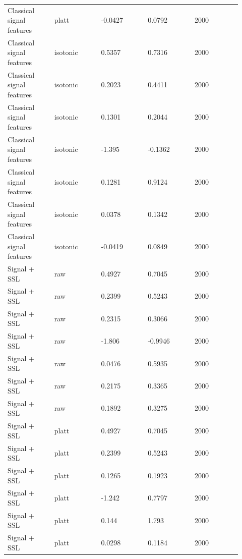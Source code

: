 \documentclass[utf8]{frontiers_suppmat}
\begin{document}
\begin{landscape}
\begin{longtable}{L{0.184\linewidth} L{0.184\linewidth} L{0.184\linewidth} L{0.184\linewidth} L{0.184\linewidth}}
Classical signal features & platt & -\allowbreak{}0.\allowbreak{}0427 & 0.\allowbreak{}0792 & 2000 \\
Classical signal features & isotonic & 0.\allowbreak{}5357 & 0.\allowbreak{}7316 & 2000 \\
Classical signal features & isotonic & 0.\allowbreak{}2023 & 0.\allowbreak{}4411 & 2000 \\
Classical signal features & isotonic & 0.\allowbreak{}1301 & 0.\allowbreak{}2044 & 2000 \\
Classical signal features & isotonic & -\allowbreak{}1.\allowbreak{}395 & -\allowbreak{}0.\allowbreak{}1362 & 2000 \\
Classical signal features & isotonic & 0.\allowbreak{}1281 & 0.\allowbreak{}9124 & 2000 \\
Classical signal features & isotonic & 0.\allowbreak{}0378 & 0.\allowbreak{}1342 & 2000 \\
Classical signal features & isotonic & -\allowbreak{}0.\allowbreak{}0419 & 0.\allowbreak{}0849 & 2000 \\
Signal + SSL & raw & 0.\allowbreak{}4927 & 0.\allowbreak{}7045 & 2000 \\
Signal + SSL & raw & 0.\allowbreak{}2399 & 0.\allowbreak{}5243 & 2000 \\
Signal + SSL & raw & 0.\allowbreak{}2315 & 0.\allowbreak{}3066 & 2000 \\
Signal + SSL & raw & -\allowbreak{}1.\allowbreak{}806 & -\allowbreak{}0.\allowbreak{}9946 & 2000 \\
Signal + SSL & raw & 0.\allowbreak{}0476 & 0.\allowbreak{}5935 & 2000 \\
Signal + SSL & raw & 0.\allowbreak{}2175 & 0.\allowbreak{}3365 & 2000 \\
Signal + SSL & raw & 0.\allowbreak{}1892 & 0.\allowbreak{}3275 & 2000 \\
Signal + SSL & platt & 0.\allowbreak{}4927 & 0.\allowbreak{}7045 & 2000 \\
Signal + SSL & platt & 0.\allowbreak{}2399 & 0.\allowbreak{}5243 & 2000 \\
Signal + SSL & platt & 0.\allowbreak{}1265 & 0.\allowbreak{}1923 & 2000 \\
Signal + SSL & platt & -\allowbreak{}1.\allowbreak{}242 & 0.\allowbreak{}7797 & 2000 \\
Signal + SSL & platt & 0.\allowbreak{}144 & 1.\allowbreak{}793 & 2000 \\
Signal + SSL & platt & 0.\allowbreak{}0298 & 0.\allowbreak{}1184 & 2000 \\

\end{longtable}
\end{landscape}
\end{document}
